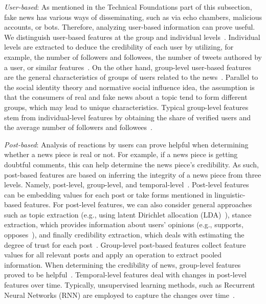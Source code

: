 \begin{description}
    \item{\emph{User-based}:} As mentioned in the Technical Foundations part of this subsection, fake news has various ways of disseminating, such as via echo chambers, malicious accounts, or bots. Therefore, analyzing user-based information can prove useful. We distinguish user-based features at the group and individual levels~\parencite{FakeNewsDetectionOnSocialMediaADataMiningPerspective_Shu}. Individual levels are extracted to deduce the credibility of each user by utilizing, for example, the number of followers and followees, the number of tweets authored by a user, or similar features~\parencite{InformationCredibilityOnTwiter_Castillo}. On the other hand, group-level user-based features are the general characteristics of groups of users related to the news~\parencite{AutomaticDetectionOfRumor_Yang}. Parallel to the social identity theory and normative social influence idea, the assumption is that the consumers of real and fake news about a topic tend to form different groups, which may lead to unique characteristics. Typical group-level features stem from individual-level features by obtaining the share of verified users and the average number of followers and followees~\parencite{DetectRumorsUsingTimeSeries_Ma}.
    \item{\emph{Post-based}:} Analysis of reactions by users can prove helpful when determining whether a news piece is real or not. For example, if a news piece is getting doubtful comments, this can help determine the news piece’s credibility. As such, post-based features are based on inferring the integrity of a news piece from three levels. Namely, post-level, group-level, and temporal-level~\parencite{FakeNewsDetectionOnSocialMediaADataMiningPerspective_Shu}. Post-level features can be embedding values for each post or take forms mentioned in linguistic-based features. For post-level features, we can also consider general approaches such as topic extraction (e.g., using latent Dirichlet allocation (LDA)~\parencite{LatentDirichletAllocation_Blei}), stance extraction, which provides information about users’ opinions (e.g., supports, opposes~\parencite{NewsVerificationByExploitingConflictingSocialViewpoints_Jin}), and finally credibility extraction, which deals with estimating the degree of trust for each post~\parencite{InformationCredibilityOnTwiter_Castillo}. Group-level post-based features collect feature values for all relevant posts and apply an operation to extract pooled information. When determining the credibility of news, group-level features proved to be helpful~\parencite{NewsVerificationByExploitingConflictingSocialViewpoints_Jin}. Temporal-level features deal with changes in post-level features over time. Typically, unsupervised learning methods, such as Recurrent Neural Networks (RNN) are employed to capture the changes over time~\parencite{DetectingRumorsFromMicroblogs_Ma}.

\end{description}
